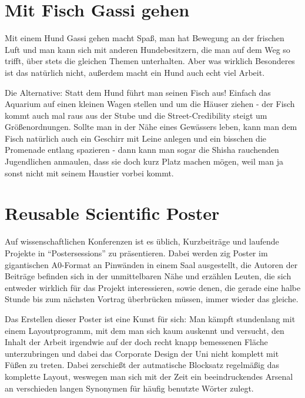 \documentclass[a5paper,pagesize,10pt,bibtotoc,pointlessnumbers,normalheadings,DIV=9,twoside=false]{scrbook}
\begin{document}

\chapter{Mit Fisch Gassi gehen}

Mit einem Hund Gassi gehen macht Spaß, man hat Bewegung an der frischen Luft und man kann sich mit anderen Hundebesitzern, die man auf dem Weg so trifft, über stets die gleichen Themen unterhalten. Aber was wirklich Besonderes ist das natürlich nicht, außerdem macht ein Hund auch echt viel Arbeit.

Die Alternative:
Statt dem Hund führt man seinen Fisch aus!
Einfach das Aquarium auf einen kleinen Wagen stellen und um die Häuser ziehen - der Fisch kommt auch mal raus aus der Stube und die Street-Credibility steigt um Größenordnungen.
Sollte man in der Nähe eines Gewässers leben, kann man dem Fisch natürlich auch ein Geschirr mit Leine anlegen und ein bisschen die Promenade entlang spazieren - dann kann man sogar die Shisha rauchenden Jugendlichen anmaulen, dass sie doch kurz Platz machen mögen, weil man ja sonst nicht mit seinem Haustier vorbei kommt.


\chapter{Reusable Scientific Poster}

Auf wissenschaftlichen Konferenzen ist es üblich, Kurzbeiträge und laufende Projekte in ``Postersessions'' zu präsentieren.
Dabei werden zig Poster im gigantischen A0-Format an Pinwänden in einem Saal ausgestellt, die Autoren der Beiträge befinden sich in der unmittelbaren Nähe und erzählen Leuten, die sich entweder wirklich für das Projekt interessieren, sowie denen, die gerade eine halbe Stunde bis zum nächsten Vortrag überbrücken müssen, immer wieder das gleiche.

Das Erstellen dieser Poster ist eine Kunst für sich:
Man kämpft stundenlang mit einem Layoutprogramm, mit dem man sich kaum auskennt und versucht, den Inhalt der Arbeit irgendwie auf der doch recht knapp bemessenen Fläche unterzubringen und dabei das Corporate Design der Uni nicht komplett mit Füßen zu treten.
Dabei zerschießt der autmatische Blocksatz regelmäßig das komplette Layout, weswegen man sich mit der Zeit ein beeindruckendes Arsenal an verschieden langen Synonymen für häufig benutzte Wörter zulegt.
\end{document}
